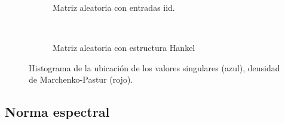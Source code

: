 	\begin{figure}[t]
		\begin{subfigure}[b]{0.45\linewidth}
			\centering
			\resizebox{0.9\linewidth}{!}{}
			\caption{Matriz aleatoria con entradas iid.}
			\label{Fig:Histograma_SingularValues_iid}
		\end{subfigure}
		~
		\begin{subfigure}[b]{0.45\linewidth} 
			\centering
			\resizebox{0.9\linewidth}{!}{}
			\caption{Matriz aleatoria con estructura Hankel}
			\label{Fig:Histograma_SingularValues_Hankel}
		\end{subfigure}
		\caption{Histograma de la ubicación de los valores singulares (azul), densidad de Marchenko-Pastur (rojo).}
		\label{Fig:svd1}
	\end{figure}
	
	\subsection{Norma espectral}
	
